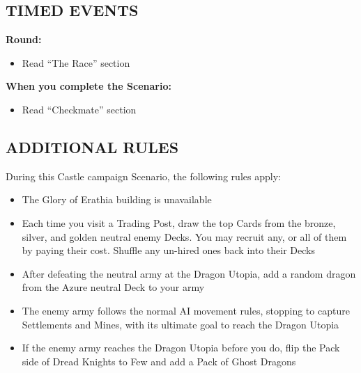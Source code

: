 \newpage

\begin{multicols}{2}

\subsection*{\MakeUppercase{Timed Events}}

\textbf{ Round:}
\begin{itemize}
  \item Read ``The Race'' section
\end{itemize}

\textbf{When you complete the Scenario:}
\begin{itemize}
  \item Read ``Checkmate'' section
\end{itemize}

\subsection*{\MakeUppercase{Additional rules}}

During this Castle campaign Scenario, the following rules apply:

\begin{itemize}
  \item The Glory of Erathia building is unavailable
  \item Each time you visit a Trading Post, draw the top Cards from the  bronze,  silver, and  golden neutral enemy Decks.
  You may recruit any, or all of them by paying their cost.
  Shuffle any un-hired ones back into their Decks
  \item After defeating the neutral army at the Dragon Utopia, add a random dragon from the  Azure neutral Deck to your army
  \item The enemy army follows the normal AI movement rules, stopping to capture Settlements and Mines, with its ultimate goal to reach the Dragon Utopia
  \item If the enemy army reaches the Dragon Utopia before you do, flip the Pack side of Dread Knights to Few and add a Pack of Ghost Dragons
\end{itemize}

\end{multicols}

